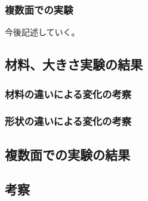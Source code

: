 \subsubsection{複数面での実験}
\label{sec:app_exp_multi_set}
今後記述していく。

\subsection{材料、大きさ実験の結果}
\label{sec:app_exp_result_material_size}

\subsubsection{材料の違いによる変化の考察}
\label{sec:app_exp_material}

\subsubsection{形状の違いによる変化の考察}
\label{sec:app_exp_size}

\subsection{複数面での実験の結果}
\label{sec:app_exp_result_multi}

\subsection{考察}
\label{sec:app_exp_dissucusion}

\clearpage
